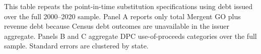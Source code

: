 \newpage
\begin{table}[H]\centering
\caption{\textbf{Debt and Revenue Substitution: Full-Period Issuer Aggregates}}
\label{tab:substitution_issuer_aggregate}
\parbox{\textwidth}{This table repeats the point-in-time substitution specifications using debt issued over the full 2000--2020 sample. Panel A reports only total Mergent GO plus revenue debt because Census debt outcomes are unavailable in the issuer aggregate. Panels B and C aggregate DPC use-of-proceeds categories over the full sample. Standard errors are clustered by state.}
\end{table}

\vspace{10pt}

\vspace{10pt}

